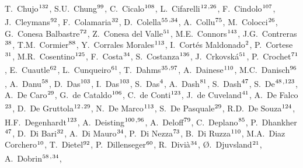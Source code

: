 \begin{flushleft}
T.~Chujo$^\textrm{\scriptsize 132}$,
S.U.~Chung$^\textrm{\scriptsize 99}$,
C.~Cicalo$^\textrm{\scriptsize 108}$,
L.~Cifarelli$^\textrm{\scriptsize 12}$\textsuperscript{,}$^\textrm{\scriptsize 26}$,
F.~Cindolo$^\textrm{\scriptsize 107}$,
J.~Cleymans$^\textrm{\scriptsize 92}$,
F.~Colamaria$^\textrm{\scriptsize 32}$,
D.~Colella$^\textrm{\scriptsize 55}$\textsuperscript{,}$^\textrm{\scriptsize 34}$,
A.~Collu$^\textrm{\scriptsize 75}$,
M.~Colocci$^\textrm{\scriptsize 26}$,
G.~Conesa Balbastre$^\textrm{\scriptsize 72}$,
Z.~Conesa del Valle$^\textrm{\scriptsize 51}$,
M.E.~Connors$^\textrm{\scriptsize 143}$,
J.G.~Contreras$^\textrm{\scriptsize 38}$,
T.M.~Cormier$^\textrm{\scriptsize 88}$,
Y.~Corrales Morales$^\textrm{\scriptsize 113}$,
I.~Cort\'{e}s Maldonado$^\textrm{\scriptsize 2}$,
P.~Cortese$^\textrm{\scriptsize 31}$,
M.R.~Cosentino$^\textrm{\scriptsize 125}$,
F.~Costa$^\textrm{\scriptsize 34}$,
S.~Costanza$^\textrm{\scriptsize 136}$,
J.~Crkovsk\'{a}$^\textrm{\scriptsize 51}$,
P.~Crochet$^\textrm{\scriptsize 71}$,
E.~Cuautle$^\textrm{\scriptsize 62}$,
L.~Cunqueiro$^\textrm{\scriptsize 61}$,
T.~Dahms$^\textrm{\scriptsize 35}$\textsuperscript{,}$^\textrm{\scriptsize 97}$,
A.~Dainese$^\textrm{\scriptsize 110}$,
M.C.~Danisch$^\textrm{\scriptsize 96}$,
A.~Danu$^\textrm{\scriptsize 58}$,
D.~Das$^\textrm{\scriptsize 103}$,
I.~Das$^\textrm{\scriptsize 103}$,
S.~Das$^\textrm{\scriptsize 4}$,
A.~Dash$^\textrm{\scriptsize 81}$,
S.~Dash$^\textrm{\scriptsize 47}$,
S.~De$^\textrm{\scriptsize 48}$\textsuperscript{,}$^\textrm{\scriptsize 123}$,
A.~De Caro$^\textrm{\scriptsize 29}$,
G.~de Cataldo$^\textrm{\scriptsize 106}$,
C.~de Conti$^\textrm{\scriptsize 123}$,
J.~de Cuveland$^\textrm{\scriptsize 41}$,
A.~De Falco$^\textrm{\scriptsize 23}$,
D.~De Gruttola$^\textrm{\scriptsize 12}$\textsuperscript{,}$^\textrm{\scriptsize 29}$,
N.~De Marco$^\textrm{\scriptsize 113}$,
S.~De Pasquale$^\textrm{\scriptsize 29}$,
R.D.~De Souza$^\textrm{\scriptsize 124}$,
H.F.~Degenhardt$^\textrm{\scriptsize 123}$,
A.~Deisting$^\textrm{\scriptsize 100}$\textsuperscript{,}$^\textrm{\scriptsize 96}$,
A.~Deloff$^\textrm{\scriptsize 79}$,
C.~Deplano$^\textrm{\scriptsize 85}$,
P.~Dhankher$^\textrm{\scriptsize 47}$,
D.~Di Bari$^\textrm{\scriptsize 32}$,
A.~Di Mauro$^\textrm{\scriptsize 34}$,
P.~Di Nezza$^\textrm{\scriptsize 73}$,
B.~Di Ruzza$^\textrm{\scriptsize 110}$,
M.A.~Diaz Corchero$^\textrm{\scriptsize 10}$,
T.~Dietel$^\textrm{\scriptsize 92}$,
P.~Dillenseger$^\textrm{\scriptsize 60}$,
R.~Divi\`{a}$^\textrm{\scriptsize 34}$,
{\O}.~Djuvsland$^\textrm{\scriptsize 21}$,
A.~Dobrin$^\textrm{\scriptsize 58}$\textsuperscript{,}$^\textrm{\scriptsize 34}$,

\end{flushleft}
